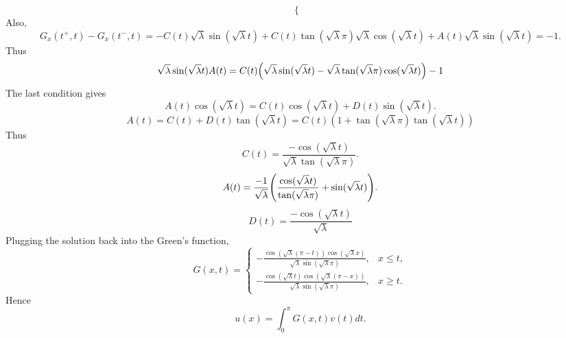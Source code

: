 \begin{example}
\begin{equation*}
\begin{cases}
        \end{cases}
    \end{equation*}
    Also, 
    \begin{equation*}
        G_x(t^+,t) - G_x(t^-,t) = -C(t)\sqrt{\lambda}\sin(\sqrt{\lambda}t) + C(t)\tan(\sqrt{\lambda}\pi)\sqrt{\lambda}\cos(\sqrt{\lambda}t) 
        + A(t)\sqrt{\lambda}\sin(\sqrt{\lambda}t)  = -1.
    \end{equation*}
    Thus 
    \begin{equation*}
        \sqrt{\lambda}\sin(\sqrt{\lambda}t)A(t) = C(t)\pth{\sqrt{\lambda}\sin(\sqrt{\lambda}t) - \sqrt{\lambda}\tan(\sqrt{\lambda}\pi)\cos(\sqrt{\lambda}t)} - 1
    \end{equation*}
    The last condition gives 
    \begin{equation*}
        A(t)\cos(\sqrt{\lambda}t) = C(t)\cos(\sqrt{\lambda}t) + D(t)\sin(\sqrt{\lambda}t).
    \end{equation*}
    \begin{equation*}
        A(t) = C(t) + D(t)\tan(\sqrt{\lambda}t)
        = C(t)(1 + \tan(\sqrt{\lambda}\pi)\tan(\sqrt{\lambda}t))
    \end{equation*}
    Thus 
    \begin{equation*}
        C(t) = \frac{-\cos(\sqrt{\lambda}t)}{\sqrt{\lambda}\tan(\sqrt{\lambda}\pi)}.
    \end{equation*}
    \begin{equation*}
        A(t) = \frac{-1}{\sqrt{\lambda}}\pth{\frac{\cos(\sqrt{\lambda}t)}{\tan(\sqrt{\lambda}\pi)} + \sin(\sqrt{\lambda}t)}. 
    \end{equation*}
    \begin{equation*}
        D(t) = \frac{-\cos(\sqrt{\lambda}t)}{\sqrt{\lambda}}
    \end{equation*}
    Plugging the solution back into the Green's function, 
    \begin{equation*}
        G(x,t) = \begin{cases}
            -\frac{\cos(\sqrt{\lambda}(\pi-t))\cos(\sqrt{\lambda}x)}{\sqrt{\lambda}\sin(\sqrt{\lambda}\pi)}, & x\leq t,\\
            -\frac{\cos(\sqrt{\lambda}t)\cos(\sqrt{\lambda}(\pi - x))}{\sqrt{\lambda}\sin(\sqrt{\lambda}\pi)}, & x\geq t.
        \end{cases}
    \end{equation*}
    Hence 
    \begin{equation*}
        u(x) = \int_0^\pi G(x,t)v(t)dt.
    \end{equation*}

\end{example}
